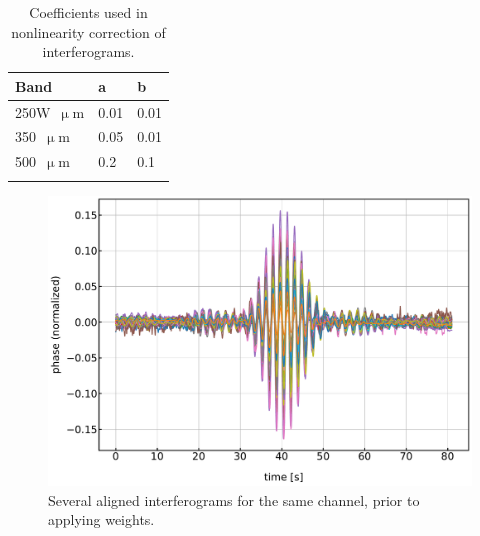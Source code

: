 \begin{table}[!htbp]
\centering
\begin{tabular}{@{}lll@{}}
\dtoprule
Band & a & b \\ \midrule
250W~$\upmu$m & 0.01 & 0.01 \\
350~$\upmu$m & 0.05 & 0.01 \\
500~$\upmu$m & 0.2 & 0.1 \\ \dbottomrule
\\
\end{tabular}
\caption{Coefficients used in nonlinearity correction of interferograms.}
\label{table:interf coeffs}
\end{table}

\begin{figure}[!htbp]
\centering
\includegraphics[width=\textwidth]{figures/blast_data/fts/interfs_350_lpf}
\caption{Several aligned interferograms for the same channel, prior to applying weights.}
\label{fig:interf lpf stack}
\end{figure}

